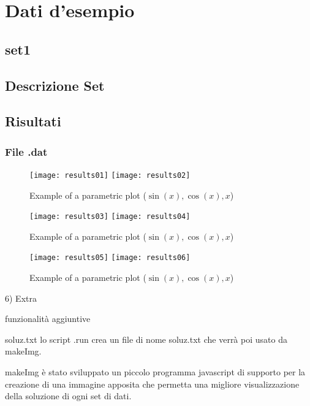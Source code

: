 
\section{Dati d'esempio}
	\subsection{set1}

	\subsection{Descrizione Set}
	\subsection{Risultati}

	\subsubsection{File .dat}
		

\newpage



\begin{figure}[h]
\centering

	\texttt{[image: results01]}
	\hspace{1cm}
	\texttt{[image: results02]}
	\caption{Example of a parametric plot ($\sin (x), \cos(x), x$)}
\end{figure}


\begin{figure}[h]
\centering
	\texttt{[image: results03]}
	\hspace{1cm}
	\texttt{[image: results04]}
\caption{Example of a parametric plot ($\sin (x), \cos(x), x$)}
\end{figure}


\begin{figure}[h]
\centering

	\texttt{[image: results05]}
	\hspace{1cm}
	\texttt{[image: results06]}
	\caption{Example of a parametric plot ($\sin (x), \cos(x), x$)}
\end{figure}


	\newpage





6) Extra


funzionalità aggiuntive


soluz.txt
lo script .run crea un file di nome soluz.txt che verrà poi usato da makeImg.


makeImg
è stato sviluppato un piccolo programma javascript di supporto per la creazione di una immagine apposita che permetta una migliore visualizzazione della soluzione di ogni set di dati.